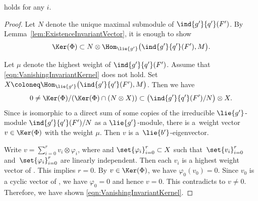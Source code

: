 \begin{Lemma}\label{lem:VanishingInvariantKernel}
	 holds for any $i$.
\end{Lemma}

\begin{proof}
	Let $N$ denote the unique maximal submodule of $\ind{g'}{q'}(F')$.
	By Lemma~\ref{lem:ExistenceInvariantVector}, it is enough to show
	\begin{align}
	\Ker(\Phi) \subset N \otimes \Hom_{\lie{g'}}\bigl(\ind{g'}{q'}(F'), M\bigr). \label{eqn:VanishingInvariantKernel}
	\end{align}

	Let $\mu$ denote the highest weight of $\ind{g'}{q'}(F')$.
	Assume that \eqref{eqn:VanishingInvariantKernel} does not hold.
	Set $X \coloneq \Hom_{\lie{g'}}\bigl(\ind{g'}{q'}(F'), M\bigr)$.
	Then we have
	\begin{align*}
		0\neq \Ker(\Phi)/(\Ker(\Phi) \cap (N \otimes X)) \subset \bigl(\ind{g'}{q'}(F') / N\bigr) \otimes X.
	\end{align*}
	Since  is isomorphic to a direct sum of some copies of the irreducible $\lie{g'}$-mod\-ule $\ind{g'}{q'}(F')/N$ as a $\lie{g'}$-module, there is a~weight vector $v \in \Ker(\Phi)$ with the weight $\mu$.
	Then $v$ is a~$\lie{b'}$-eigenvector.

	Write $v= \sum_{i=0}^r v_i\otimes \varphi_i$, where 
	and $\set{\varphi_i}_{i=0}^r \subset X$
	such that~$\set{v_i}_{i=0}^r$ and~$\set{\varphi_i}_{i=0}^r$ are linearly independent.
	Then each $v_i$ is a highest weight vector of .
	This implies $r=0$.
	By $v \in \Ker(\Phi)$, we have $\varphi_0(v_0)=0$.
	Since $v_0$ is a cyclic vector of , we have $\varphi_0 = 0$ and hence $v = 0$.
	This contradicts to $v \neq 0$.
	Therefore, we have shown \eqref{eqn:VanishingInvariantKernel}.
\end{proof}

